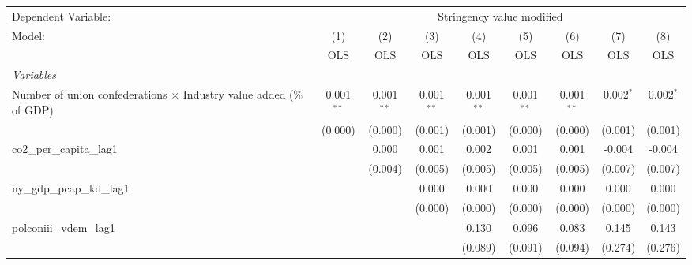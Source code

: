 
\begingroup
\centering
\begin{tabular}{lcccccccc}
   \toprule
   Dependent Variable: & \multicolumn{8}{c}{Stringency value modified}\\
   Model:                                                                     & (1)          & (2)          & (3)          & (4)          & (5)          & (6)          & (7)         & (8)\\  
                                                                              &  OLS         & OLS          & OLS          & OLS          & OLS          & OLS          & OLS         & OLS\\  
   \midrule
   \emph{Variables}\\
   Number of union confederations $\times$ Industry value added (\% of GDP)   & 0.001$^{**}$ & 0.001$^{**}$ & 0.001$^{**}$ & 0.001$^{**}$ & 0.001$^{**}$ & 0.001$^{**}$ & 0.002$^{*}$ & 0.002$^{*}$\\   
                                                                              & (0.000)      & (0.000)      & (0.001)      & (0.001)      & (0.000)      & (0.000)      & (0.001)     & (0.001)\\   
   co2\_per\_capita\_lag1                                                     &              & 0.000        & 0.001        & 0.002        & 0.001        & 0.001        & -0.004      & -0.004\\   
                                                                              &              & (0.004)      & (0.005)      & (0.005)      & (0.005)      & (0.005)      & (0.007)     & (0.007)\\   
   ny\_gdp\_pcap\_kd\_lag1                                                    &              &              & 0.000        & 0.000        & 0.000        & 0.000        & 0.000       & 0.000\\   
                                                                              &              &              & (0.000)      & (0.000)      & (0.000)      & (0.000)      & (0.000)     & (0.000)\\   
   polconiii\_vdem\_lag1                                                      &              &              &              & 0.130        & 0.096        & 0.083        & 0.145       & 0.143\\   
                                                                              &              &              &              & (0.089)      & (0.091)      & (0.094)      & (0.274)     & (0.276)\\   

\end{tabular}
